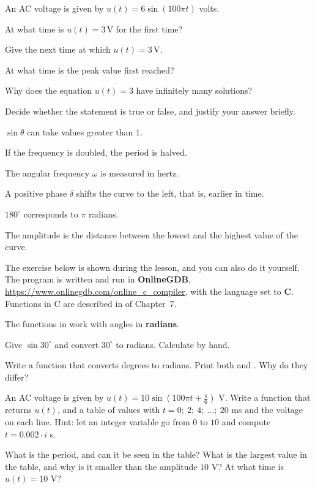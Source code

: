 An AC voltage is given by $u(t) = 6\sin(100\pi t)$ volts.
\begin{parts}
  \item At what time is $u(t) = 3\,\text{V}$ for the first time?
  \item Give the next time at which $u(t) = 3\,\text{V}$.
  \item At what time is the peak value first reached?
  \item Why does the equation $u(t) = 3$ have infinitely many solutions?
\end{parts}

Decide whether the statement is true or false, and justify your answer briefly.
\begin{parts}
  \item $\sin\theta$ can take values greater than $1$.
  \item If the frequency is doubled, the period is halved.
  \item The angular frequency $\omega$ is measured in hertz.
  \item A positive phase $\delta$ shifts the curve to the left, that is, earlier in time.
  \item $180^{\circ}$ corresponds to $\pi$ radians.
  \item The amplitude is the distance between the lowest and the highest value of the curve.
\end{parts}

The exercise below is shown during the lesson, and you can also do it yourself. The program is
written and run in \textbf{OnlineGDB}, \url{https://www.onlinegdb.com/online_c_compiler}, with the
language set to \textbf{C}. Functions in C are described in  of Chapter~7.

The functions in  work with angles in \textbf{radians}.
\begin{parts}
  \item Give $\sin 30^{\circ}$ and convert $30^{\circ}$ to radians. Calculate by hand.
  \item Write a function  that converts degrees to
    radians. Print both  and . Why do they differ?
  \item An AC voltage is given by $u(t) = 10\sin\left(100\pi t + \frac{\pi}{6}\right)$ V. Write a
    function  that returns $u(t)$, and a table of values with
    $t = 0;\ 2;\ 4;\ \ldots;\ 20$ ms and the voltage on each line. Hint: let an integer variable
     go from $0$ to $10$ and compute $t = 0.002 \cdot i$ s.
  \item What is the period, and can it be seen in the table? What is the largest value in the
    table, and why is it smaller than the amplitude $10$ V? At what time is $u(t) = 10$ V?
\end{parts}

